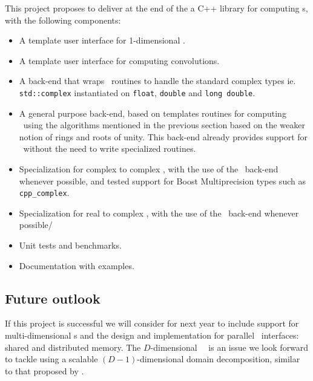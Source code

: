 This project proposes to deliver at the end of the  a C++ library for
computing \fft{}s, with the following components:
\begin{itemize}
    \item A template user interface for 1-dimensional \dft.
    \item A template user interface for computing convolutions.
    \item A back-end that wraps \fftw\ routines to handle the standard complex types
    ie. \verb|std::complex| instantiated on \verb|float|,
    \verb|double| and \verb|long double|.
    \item A general purpose back-end, based on 
    templates routines for computing \dft\ using the algorithms
    mentioned in the previous section based on the weaker notion of rings and
    roots of unity. 
    This back-end already provides support for \ntt\ without the need to write
    specialized routines.
    \item Specialization for complex to complex \dft, with the use of the \fftw\
    back-end whenever possible,
    and tested support for Boost Multiprecision types such as
    \verb|cpp_complex|.
    \item Specialization for real to complex \dft, with the use of the \fftw\
    back-end whenever possible/
    \item Unit tests and benchmarks.
    \item Documentation with examples.
\end{itemize}

\subsection{Future outlook}
If this project is successful we will consider for next year to include support
for multi-dimensional \dft{}s and the design and implementation for
parallel \fft\ interfaces: shared and distributed memory. 
The $D$-dimensional \mpi\ \dft\ is an issue we look forward to tackle
using a scalable $(D-1)$-dimensional domain decomposition,
similar to that proposed by \cite{pippig_13}.
